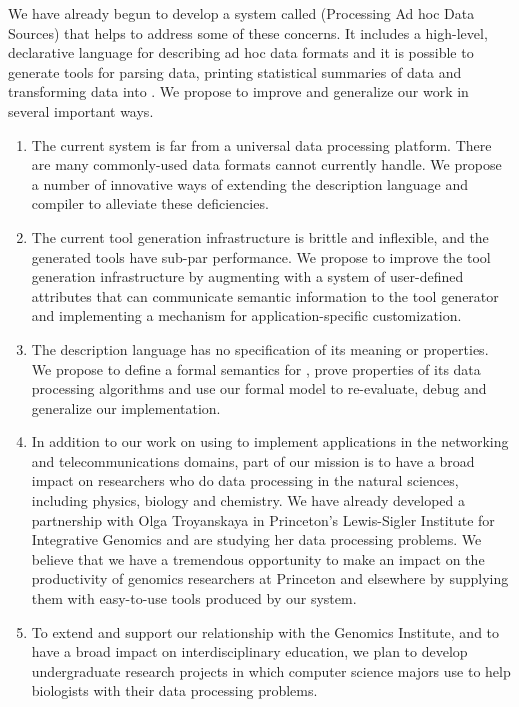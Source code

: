 \documentclass[11pt]{article}
\begin{document}
We have already begun to develop a system called \pads{} (Processing
Ad hoc Data Sources) that helps to address some of these concerns.
It includes a high-level, declarative language for describing
ad hoc data formats and it is possible to generate tools for
parsing data, printing statistical summaries of data and transforming 
data into \xml.  We propose to improve and generalize our work 
in several important ways.

\begin{enumerate}
\item The current \pads{} system is far from a universal
data processing platform.  There are many commonly-used
data formats \pads{} cannot currently handle.  We propose
a number of innovative ways of extending the \pads{} description language
and compiler to alleviate these deficiencies.
\item The current \pads{} tool generation infrastructure is brittle and
inflexible, and the generated tools have sub-par performance.  We propose
to improve the tool generation infrastructure by augmenting \pads{}
with a system of user-defined attributes that can communicate
semantic information to the tool generator and implementing a mechanism for 
application-specific customization.
\item The \pads{} description language has no specification of its 
meaning or properties.  We propose to define a formal semantics for 
\pads{}, prove properties of its data processing algorithms and
use our formal model to re-evaluate, debug and generalize our 
implementation.  
\item In addition to our work on using \pads{} to implement applications 
in the networking and telecommunications domains, part of our mission
is to have a broad impact on researchers who do data processing
in the natural sciences, including physics, biology and chemistry.
We have already developed a partnership with
Olga Troyanskaya in Princeton's Lewis-Sigler Institute for 
Integrative Genomics
and are studying her data processing problems.  We believe that 
we have a tremendous
opportunity to make an impact on the productivity of 
genomics researchers at Princeton
and elsewhere by supplying them with easy-to-use tools produced by our system.
\item To extend and support our relationship with the Genomics Institute,
and to have a broad impact on interdisciplinary education,
we plan to develop undergraduate research projects in which
computer science majors use \pads{} to help biologists 
with their data processing problems.  
\end{enumerate}
\end{document}
